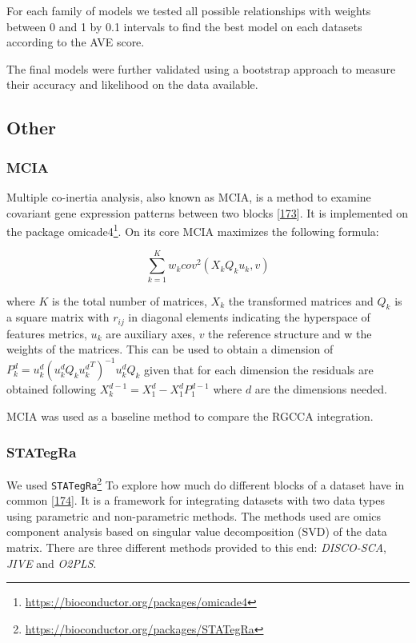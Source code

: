 \documentclass[
  12pt,
  a4paper,
  twoside,
  openright]{book}
\DeclareRobustCommand{\href}[2]{#2\footnote{\url{#1}}}
\begin{document}
For each family of models we tested all possible relationships with weights between 0 and 1 by 0.1 intervals to find the best model on each datasets according to the AVE score.

The final models were further validated using a bootstrap approach to measure their accuracy and likelihood on the data available.

\hypertarget{other}{%
\subsection{Other}\label{other}}

\hypertarget{mcia}{%
\subsubsection{MCIA}\label{mcia}}

Multiple co-inertia analysis, also known as MCIA, is a method to examine covariant gene expression patterns between two blocks {[}\protect\hyperlink{ref-meng2014}{173}{]}.
It is implemented on the package \href{https://bioconductor.org/packages/omicade4}{omicade4}.
On its core MCIA maximizes the following formula:

\[
\sum_{k=1}^K w_k {cov}^2 (X_k Q_k u_k, v)
\]

where \(K\) is the total number of matrices, \(X_k\) the transformed matrices and \(Q_k\) is a square matrix with \(r_{ij}\) in diagonal elements indicating the hyperspace of features metrics, \(u_k\) are auxiliary axes, \(v\) the reference structure and w the weights of the matrices.
This can be used to obtain a dimension of \(P_k^d=u_k^d(u_k^d Q_k {u_k^d}^T)^{-1} u_k^d Q_k\) given that for each dimension the residuals are obtained following \(X_k^{d-1} = X_1^d- X_1^d P_1^{d-1}\) where \(d\) are the dimensions needed.

MCIA was used as a baseline method to compare the RGCCA integration.

\hypertarget{stategra}{%
\subsubsection{STATegRa}\label{stategra}}

We used \href{https://bioconductor.org/packages/STATegRa}{\texttt{STATegRa}} To explore how much do different blocks of a dataset have in common {[}\protect\hyperlink{ref-planell2021}{174}{]}.
It is a framework for integrating datasets with two data types using parametric and non-parametric methods.
The methods used are omics component analysis based on singular value decomposition (SVD) of the data matrix.
There are three different methods provided to this end: \emph{DISCO-SCA}, \emph{JIVE} and \emph{O2PLS}.
\end{document}

